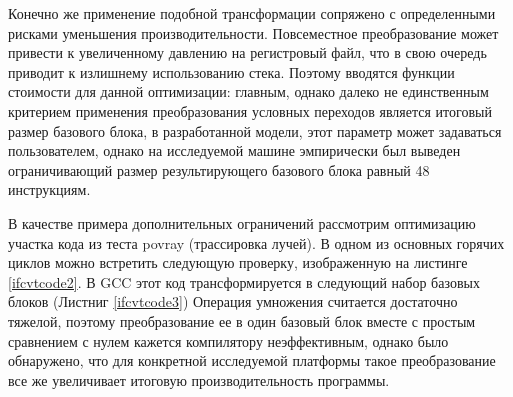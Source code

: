 Конечно же применение подобной трансформации сопряжено с определенными рисками уменьшения производительности. Повсеместное преобразование может привести к увеличенному давлению на регистровый файл, что в свою очередь приводит к излишнему использованию стека. Поэтому вводятся функции стоимости для данной оптимизации: главным, однако далеко не единственным критерием применения преобразования условных переходов является итоговый размер базового блока, в  разработанной модели, этот параметр может задаваться пользователем, однако на исследуемой машине эмпирически был выведен  ограничивающий размер  результирующего базового блока равный 48 инструкциям.


В качестве примера дополнительных ограничений рассмотрим оптимизацию участка кода из теста povray (трассировка лучей). В одном из основных горячих циклов можно встретить следующую проверку, изображенную на листинге \ref{ifcvtcode2}. В GCC этот код трансформируется в следующий набор базовых блоков (Листниг \ref{ifcvtcode3}) Операция умножения считается достаточно тяжелой, поэтому преобразование ее в  один базовый блок вместе с простым сравнением с нулем кажется компилятору неэффективным, однако было обнаружено, что для конкретной исследуемой платформы такое преобразование все же увеличивает итоговую производительность программы.  



